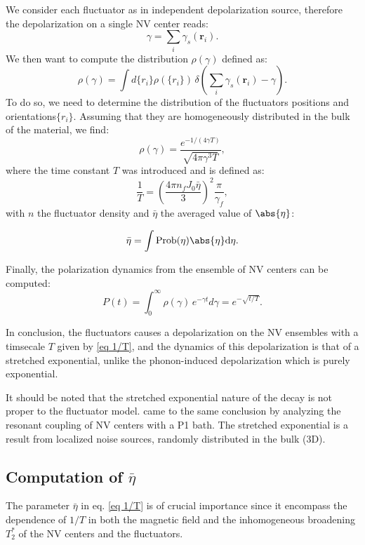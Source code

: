 \documentclass[a4paper,11pt]{report}
\begin{document}
We consider each fluctuator as in independent depolarization source, therefore the depolarization on a single NV center reads: 
\begin{equation}
\gamma=\sum_i \gamma_s(\mathbf{r}_i).
\end{equation}
We then want to compute the distribution $\rho(\gamma)$ defined as:
\begin{equation}
\rho(\gamma)=\int d\{r_i\} \rho(\{r_i\})\, \delta \left( \sum_i \gamma_s(\mathbf{r}_i) - \gamma \right).
\end{equation}
To do so, we need to determine the distribution of the fluctuators positions and orientations$\{r_i\}$. Assuming that they are homogeneously distributed in the bulk of the material, we find:
\begin{equation}
\rho(\gamma)=\frac{e^{-1/(4\gamma T)}}{\sqrt{4\pi \gamma^3 T}},
\end{equation}
where the time constant $T$ was introduced and is defined as:
\begin{equation}
\frac{1}{T}=\left(\frac{4\pi n_fJ_0\bar \eta}{3}\right)^2 \frac{\pi}{\gamma_f},
\label{eq 1/T}
\end{equation}
with $n$ the fluctuator density and $\bar \eta$ the averaged value of $\abs{\eta}$: 

\begin{equation}
\bar \eta = \int \rm{Prob}(\eta) \abs{\eta} d\eta.
\end{equation}

Finally, the polarization dynamics from the ensemble of NV centers can be computed:
\begin{equation}
P(t)=\int_0^\infty \rho(\gamma)\, e^{-\gamma t}d\gamma= e^{-\sqrt{t/T}}.
\end{equation}

In conclusion, the fluctuators causes a depolarization on the NV ensembles with a timsecale $T$ given by \ref{eq 1/T}, and the dynamics of this depolarization is that of a stretched exponential, unlike the phonon-induced depolarization which is purely exponential. 

It should be noted that the stretched exponential nature of the decay is not proper to the fluctuator model. \citep{hall2016detection} came to the same conclusion by analyzing the resonant coupling of NV centers with a P1 bath. The stretched exponential is a result from localized noise sources, randomly distributed in the bulk (3D).

\subsection{Computation of $\bar \eta$}
\label{sec computation eta}
The parameter $\bar \eta$ in eq. \ref{eq 1/T} is of crucial importance since it encompass the dependence of $1/T$ in both the magnetic field and the inhomogeneous broadening $T_2^*$ of the NV centers and the fluctuators.
\end{document}

